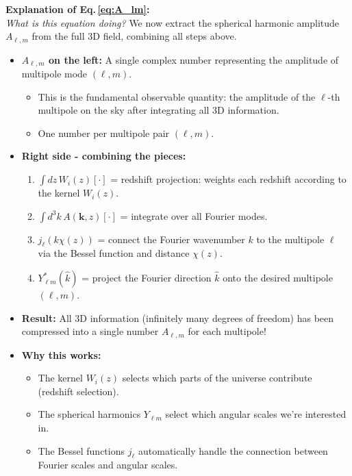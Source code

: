 \noindent\textbf{\large Explanation of Eq.\,\eqref{eq:A_lm}:}\\
\textit{What is this equation doing?} We now extract the spherical harmonic amplitude $A_{\ell,m}$ from the full 3D field, combining all steps above.
\begin{itemize}[leftmargin=1.5cm]
    \item \textbf{$A_{\ell, m}$ on the left:} A single complex number representing the amplitude of multipole mode $(\ell, m)$.
        \begin{itemize}
            \item This is the fundamental observable quantity: the amplitude of the $\ell$-th multipole on the sky after integrating all 3D information.
            \item One number per multipole pair $(\ell, m)$.
        \end{itemize}
    
    \item \textbf{Right side - combining the pieces:}
        \begin{enumerate}
            \item $\int dz\, W_i(z) [\cdot]$ = redshift projection: weights each redshift according to the kernel $W_i(z)$.
            \item $\int d^3k \, A(\mathbf{k}, z) [\cdot]$ = integrate over all Fourier modes.
            \item $j_\ell(k\chi(z))$ = connect the Fourier wavenumber $k$ to the multipole $\ell$ via the Bessel function and distance $\chi(z)$.  
            \item $Y^*_{\ell m}(\hat{k})$ = project the Fourier direction $\hat{k}$ onto the desired multipole $(\ell, m)$.
        \end{enumerate}
    
    \item \textbf{Result:} All 3D information (infinitely many degrees of freedom) has been compressed into a single number $A_{\ell,m}$ for each multipole!
    
    \item \textbf{Why this works:}
        \begin{itemize}
            \item The kernel $W_i(z)$ selects which parts of the universe contribute (redshift selection).
            \item The spherical harmonics $Y_{\ell m}$ select which angular scales we're interested in.
            \item The Bessel functions $j_\ell$ automatically handle the connection between Fourier scales and angular scales.
        \end{itemize}
\end{itemize}

